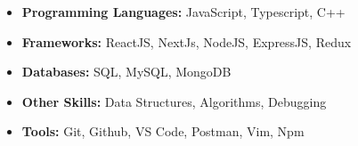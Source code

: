\documentclass[10pt,a4paper,ragged2e]{altacv}
\begin{document}
\smallskip
\smallskip
\smallskip
\smallskip
\smallskip
\smallskip
\smallskip

\smallskip
\begin{itemize}
\item \textbf{Programming Languages: }\small {JavaScript, Typescript, C++}\smallskip
  \item \textbf{Frameworks:}\small{ ReactJS, NextJs, NodeJS, ExpressJS, Redux}\smallskip
  \item \textbf{Databases: }\small{SQL, MySQL, MongoDB}
   \smallskip
   \item \textbf{Other Skills: }\small{Data Structures, Algorithms, Debugging}\smallskip
  \item \textbf{Tools: }\small{Git, Github, VS Code, Postman, Vim, Npm}\smallskip
\end{itemize}






\end{document}
